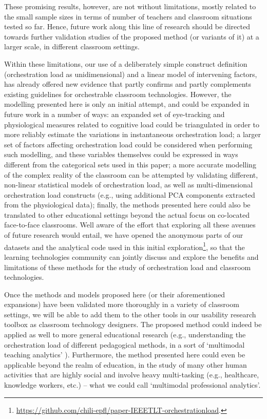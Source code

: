 \documentclass[10pt,journal,compsoc]{IEEEtran}
\begin{document}
These promising results, however, are not without limitations, mostly related to the small sample sizes in terms of number of teachers and classroom situations tested so far. Hence, future work along this line of research should be directed towards further validation studies of the proposed method (or variants of it) at a larger scale, in different classroom settings. 

Within these limitations, our use of a deliberately simple construct definition (orchestration load as unidimensional) and a linear model of intervening factors, has already offered new evidence that partly confirms and partly complements existing guidelines for orchestrable classroom technologies. However, the modelling presented here is only an initial attempt, and could be expanded in future work in a number of ways: an expanded set of eye-tracking and physiological measures related to cognitive load could be triangulated in order to more reliably estimate the variations in instantaneous orchestration load; a larger set of factors affecting orchestration load could be considered when performing such modelling, and these variables themselves could be expressed in ways different from the categorical sets used in this paper; a more accurate modelling of the complex reality of the classroom can be attempted by validating different, non-linear statistical models of orchestration load, as well as multi-dimensional orchestration load constructs (e.g., using additional PCA components extracted from the physiological data); finally, the methods presented here could also be translated to other educational settings beyond the actual focus on co-located face-to-face classrooms. Well aware of the effort that exploring all these avenues of future research would entail, we have opened the anonymous parts of our datasets and the analytical code used in this initial exploration\footnote{\href{https://github.com/chili-epfl/paper-IEEETLT-orchestrationload}{https://github.com/chili-epfl/paper-IEEETLT-orchestrationload}.}, so that the learning technologies community can jointly discuss and explore the benefits and limitations of these methods for the study of orchestration load and classroom technologies.

Once the methods and models proposed here (or their aforementioned expansions) have been validated more thoroughly in a variety of classroom settings, we will be able to add them to the other tools in our usability research toolbox as classroom technology designers. The proposed method could indeed be applied as well to more general educational research (e.g., understanding the orchestration load of different pedagogical methods, in a sort of `multimodal teaching analytics' \cite{prieto2016teaching}). Furthermore, the method presented here could even be applicable beyond the realm of education, in the study of many other human activities that are highly social and involve heavy multi-tasking (e.g., healthcare, knowledge workers, etc.) -- what we could call `multimodal professional analytics'.
\end{document}
